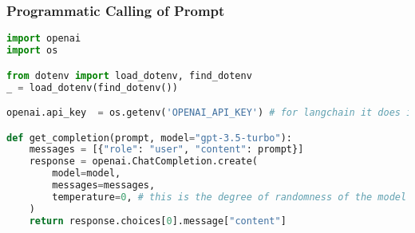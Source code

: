 







\begin{frame}[fragile]\frametitle{Programmatic Calling of Prompt}

\begin{lstlisting}[language=Python]
import openai
import os

from dotenv import load_dotenv, find_dotenv
_ = load_dotenv(find_dotenv())

openai.api_key  = os.getenv('OPENAI_API_KEY') # for langchain it does it automatically

def get_completion(prompt, model="gpt-3.5-turbo"):
    messages = [{"role": "user", "content": prompt}]
    response = openai.ChatCompletion.create(
        model=model,
        messages=messages,
        temperature=0, # this is the degree of randomness of the model's output
    )
    return response.choices[0].message["content"]
\end{lstlisting}
		
\end{frame}

